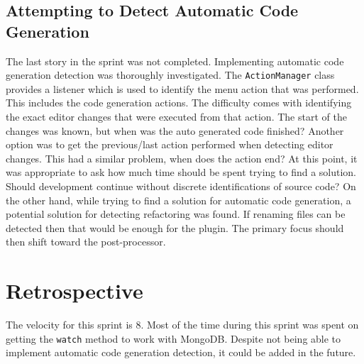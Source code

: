 \subsection{Attempting to Detect Automatic Code Generation}
The last story in the sprint was not completed. Implementing automatic code generation detection was thoroughly investigated. The \texttt{ActionManager} class provides a listener which is used to identify the menu action that was performed. This includes the code generation actions. The difficulty comes with identifying the exact editor changes that were executed from that action. The start of the changes was known, but when was the auto generated code finished? Another option was to get the previous/last action performed when detecting editor changes. This had a similar problem, when does the action end? At this point, it was appropriate to ask how much time should be spent trying to find a solution. Should development continue without discrete identifications of source code? On the other hand, while trying to find a solution for automatic code generation, a potential solution for detecting refactoring was found. If renaming files can be detected then that would be enough for the plugin. The primary focus should then shift toward the post-processor.

\section{Retrospective}
The velocity for this sprint is 8. Most of the time during this sprint was spent on getting the \texttt{watch} method to work with MongoDB. Despite not being able to implement automatic code generation detection, it could be added in the future.
